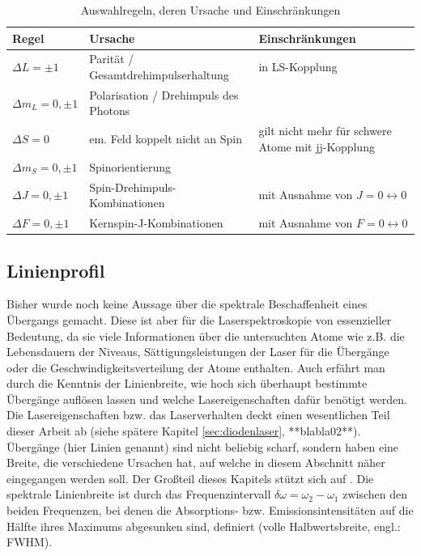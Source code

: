 \begin{table}
	\begin{tabular}{p{}p{}p{}}

		\toprule
		Regel & Ursache & Einschränkungen \\
		\midrule[1px]
		\hline
		$\Delta L = \pm1$ & Parität / Gesamtdrehimpulserhaltung & in LS-Kopplung \\
		$\Delta m_L = 0, \pm1$ & Polarisation / Drehimpuls des Photons & \\
		$\Delta S = 0$ & em. Feld koppelt nicht an Spin & gilt nicht mehr für schwere
		Atome mit jj-Kopplung \\
		$\Delta m_S = 0, \pm1$ & Spinorientierung & \\
		$\Delta J = 0, \pm1$ & Spin-Drehimpuls-Kombinationen & mit Ausnahme von
		$J=0\leftrightarrow0$
		\\
		$\Delta F = 0, \pm1$ & Kernspin-J-Kombinationen & mit Ausnahme von
		$F=0\leftrightarrow0$
		\\
		\bottomrule[1px]
	\end{tabular}
	\caption{Auswahlregeln, deren Ursache und Einschränkungen}
	\label{tab:auswahlregeln}
\end{table}



\subsection{Linienprofil}\label{sec:linienprofil}
Bisher wurde noch keine Aussage über die spektrale Beschaffenheit eines
Übergangs gemacht. Diese ist aber für die Laserspektroskopie von essenzieller
Bedeutung, da sie viele Informationen über die untersuchten Atome wie z.B. die
Lebensdauern der Niveaus, Sättigungsleistungen der Laser für die Übergänge oder
die Geschwindigkeitsverteilung der Atome enthalten. Auch erfährt man durch die
Kenntnis der Linienbreite, wie hoch sich überhaupt bestimmte Übergänge auflösen
lassen und welche Lasereigenschaften dafür benötigt werden. Die
Lasereigenschaften bzw. das Laserverhalten deckt einen wesentlichen Teil
dieser Arbeit ab (siehe spätere Kapitel \ref{sec:diodenlaser}, **blabla02**).
Übergänge (hier Linien genannt) sind nicht beliebig scharf, sondern haben eine Breite, die verschiedene Ursachen hat, auf welche in diesem Abschnitt näher eingegangen werden soll. Der Großteil dieses Kapitels stützt sich auf \cite{demtroeder:laserspektroskopie}. Die spektrale Linienbreite ist durch das Frequenzintervall $\delta\omega=\omega_2-\omega_1$ zwischen den beiden
Frequenzen, bei denen die Absorptions- bzw. Emissionsintensitäten auf die Hälfte
ihres Maximums abgesunken sind, definiert (volle Halbwertsbreite, engl.:
FWHM).

